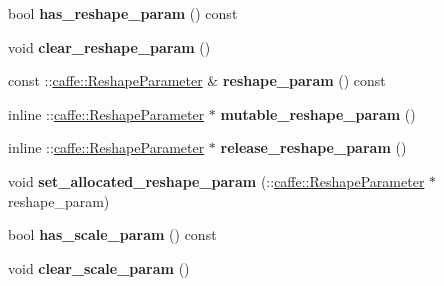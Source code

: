 \begin{DoxyCompactItemize}
\item 
\mbox{\label{classcaffe_1_1_layer_parameter_a9c1cee8569307735c597113b3c78de99}} 
bool {\bfseries has\+\_\+reshape\+\_\+param} () const
\item 
\mbox{\label{classcaffe_1_1_layer_parameter_a1ec30c5ddf7f7a5b64339b0015cf8d41}} 
void {\bfseries clear\+\_\+reshape\+\_\+param} ()
\item 
\mbox{\label{classcaffe_1_1_layer_parameter_a8132e1580dbe4dcd22c6961f951ba5bc}} 
const \+::\mbox{\hyperlink{classcaffe_1_1_reshape_parameter}{caffe\+::\+Reshape\+Parameter}} \& {\bfseries reshape\+\_\+param} () const
\item 
\mbox{\label{classcaffe_1_1_layer_parameter_a052e484c81a8ad01c0d10b0131f8c181}} 
inline \+::\mbox{\hyperlink{classcaffe_1_1_reshape_parameter}{caffe\+::\+Reshape\+Parameter}} $\ast$ {\bfseries mutable\+\_\+reshape\+\_\+param} ()
\item 
\mbox{\label{classcaffe_1_1_layer_parameter_a8ed7f53e073479b5fc87340e33cc7257}} 
inline \+::\mbox{\hyperlink{classcaffe_1_1_reshape_parameter}{caffe\+::\+Reshape\+Parameter}} $\ast$ {\bfseries release\+\_\+reshape\+\_\+param} ()
\item 
\mbox{\label{classcaffe_1_1_layer_parameter_ae1b4e1260ef6c729a99cc1e2e365a1da}} 
void {\bfseries set\+\_\+allocated\+\_\+reshape\+\_\+param} (\+::\mbox{\hyperlink{classcaffe_1_1_reshape_parameter}{caffe\+::\+Reshape\+Parameter}} $\ast$reshape\+\_\+param)
\item 
\mbox{\label{classcaffe_1_1_layer_parameter_af3750ff2f63f24a2a332e3841cb45407}} 
bool {\bfseries has\+\_\+scale\+\_\+param} () const
\item 
\mbox{\label{classcaffe_1_1_layer_parameter_acedd7220b35cd01d9113d4570483a543}} 
void {\bfseries clear\+\_\+scale\+\_\+param} ()
\item 
\mbox{\label{classcaffe_1_1_layer_parameter_aacd00a842357846ba474123f76506ec9}} 

\end{DoxyCompactItemize}
